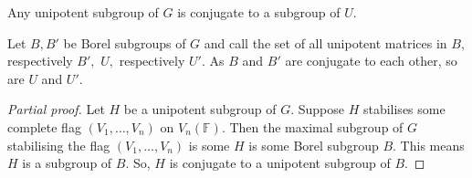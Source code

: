\begin{theorem}[Kolchen]
	Any unipotent subgroup of $G$ is conjugate to a subgroup of $U.$
\end{theorem}

Let $B, B'$ be Borel subgroups of $G$ and call the set of all unipotent
matrices in $B,$ respectively $B',$ $U,$ respectively $U'.$
As $B$ and $B'$ are conjugate to each other, so are $U$ and $U'.$

\begin{proof}[Partial proof]
	Let $H$ be a unipotent subgroup of $G.$
	Suppose $H$ stabilises some complete flag $(V_1, \dotsc, V_n)$
on $V_n(\mathbb{F}).$ Then the maximal subgroup of $G$ stabilising the
flag $(V_1, \dotsc, V_n)$ is some $H$ is some Borel subgroup $B.$ This means $H$ is a subgroup of $B.$
So, $H$ is conjugate to a unipotent subgroup of $B.$
\end{proof}
